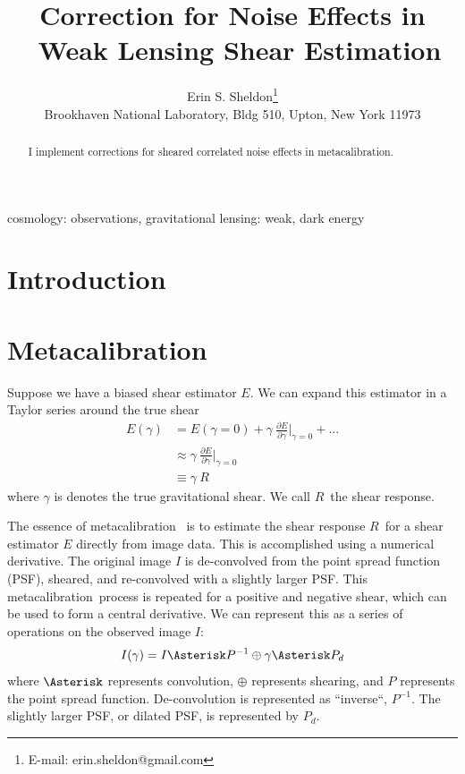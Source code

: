 \documentclass[usegraphicx,usenatbib]{mn2e}
\title{Correction for Noise Effects in \Mcal\ Weak Lensing Shear Estimation}
\author[Erin S. Sheldon]{Erin S. Sheldon\thanks{E-mail: erin.sheldon@gmail.com}\\
Brookhaven National Laboratory, Bldg 510, Upton, New York 11973}
\newcommand{\mcal}{metacalibration}
\newcommand{\Mcal}{Metacalibration}
\newcommand{\mcalR}{$R$}
\begin{document}
\maketitle

\begin{abstract}

I implement corrections for sheared correlated noise effects in \mcal.   

\end{abstract}


\begin{keywords}                                                                    
    cosmology: observations,
    gravitational lensing: weak,
    dark energy
\end{keywords} 

\section{Introduction} \label{sec:intro}

\section{\Mcal} \label{sec:algo}

Suppose we have a biased shear estimator $E$.  We can expand this estimator
in a Taylor series around the true shear
\begin{align}
    E(\gamma) &= E(\gamma=0) + \gamma ~ \frac{ \partial E }{ \partial \gamma }\bigg|_{\gamma=0}  + ... \nonumber \\
      & \approx  \gamma ~ \frac{ \partial E }{ \partial \gamma } \bigg|_{\gamma=0}  \\
      & \equiv  \gamma ~ \mbox{\mcalR} \nonumber
\end{align}
where $\gamma$ is denotes the true gravitational shear.  We call \mcalR\
the shear response.

The essence of \mcal\ \citep{HuffMcal} is to estimate the shear response
\mcalR\ for a shear estimator $E$ directly from image data.  This is
accomplished using a numerical derivative.  The original image $I$ is
de-convolved from the point spread function (PSF), sheared, and re-convolved
with a slightly larger PSF.  This \mcal\ process is repeated for a
positive and negative shear, which can be used to form a central derivative.
We can represent this as a series of operations on the observed image $I$:
\begin{equation}
    I(\gamma) = I \Asterisk P^{-1} \oplus \gamma \Asterisk P_{d}
\end{equation}
where $\Asterisk$ represents convolution, $\oplus$ represents shearing,
and $P$ represents the point spread function.  De-convolution
is represented as ``inverse``, $P^{-1}$.  The slightly larger PSF, or
dilated PSF, is represented by $P_{d}$.
\end{document}
